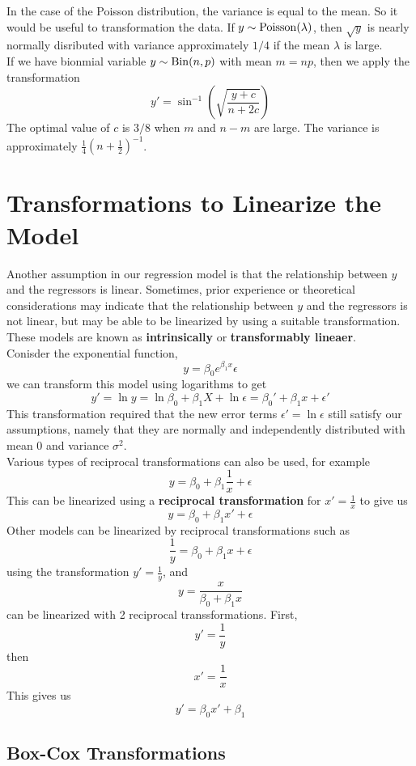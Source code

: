 In the case of the Poisson distribution, the variance is equal to the mean. So it would be useful to transformation the data. If $y \sim \operatorname{Poisson}(\lambda)$, then $\sqrt{y}$ is nearly normally disributed with variance approximately $1/4$ if the mean $\lambda$ is large.\\

If we have bionmial variable $y \sim \operatorname{Bin}(n,p)$ with mean $m = np$, then we apply the transformation 
\[y' = \sin^{-1}\left(\sqrt{\frac{y + c}{n + 2c}}\right)\]
The optimal value of $c$ is $3/8$ when $m$ and $n-m$ are large. The variance is approximately $\frac{1}{4}\left(n+\frac{1}{2}\right)^{-1}$.

\section{Transformations to Linearize the Model}

Another assumption in our regression model is that the relationship between $y$ and the regressors is linear. Sometimes, prior experience or theoretical considerations may indicate that the relationship between $y$ and the regressors is not linear, but may be able to be linearized by using a suitable transformation. These models are known as \textbf{intrinsically} or \textbf{transformably lineaer}.\\[1ex]
\indent
Conisder the exponential function, 
\[y = \beta_0e^{\beta_1x}\epsilon\]
we can transform this model using logarithms to get 
\[y' = \ln y = \ln \beta_0 + \beta_1X + \ln \epsilon = \beta_0' + \beta_1x + \epsilon'\]
This transformation required that the new error terms $\epsilon' = \ln \epsilon$ still satisfy our assumptions, namely that they are normally and independently distributed with mean 0 and variance $\sigma^2$. \\ 
\noindent
Various types of reciprocal transformations can also be used, for example 
\[y = \beta_0 + \beta_1\frac{1}{x}+\epsilon\]
This can be linearized using a \textbf{reciprocal transformation} for $x' = \frac{1}{x}$ to give us  
\[y = \beta_0 + \beta_1x' + \epsilon\]
Other models can be linearized by reciprocal transformations such as 
\[\frac{1}{y} = \beta_0 + \beta_1x + \epsilon\]
using the transformation $y' = \frac{1}{y}$, and 
\[y = \frac{x}{\beta_0 + \beta_1x}\]
can be linearized with 2 reciprocal transsformations. First, 
\[y' = \frac{1}{y}\]
then 
\[x' = \frac{1}{x}\]
This gives us 
\[y'= \beta_0x' + \beta_1\]

\subsection{Box-Cox Transformations}

